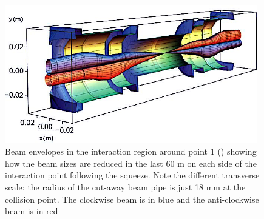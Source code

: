 \begin{figure}[ht]
  \begin{center}
    \includegraphics[width=0.98\textwidth]{figs/detector/beamcross.png}
  \end{center}
  \caption[Beam envelopes in the interaction region around point 1 (\ATLAS) showing how the beam sizes are reduced in the last 60 m on each side of the interaction point following the squeeze.]{Beam envelopes in the interaction region around point 1 (\ATLAS) showing how the beam sizes are reduced in the last 60 m on each side of the interaction point following the squeeze.
  Note the different transverse scale: the radius of the cut-away beam pipe is just 18 mm at the collision point.
  The clockwise beam is in blue and the anti-clockwise beam is in red~\cite{BeamEnvelopes}}
  \label{fig:detector:beamcross}
\end{figure}

